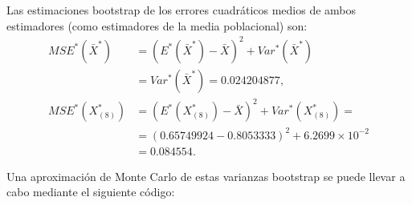 \documentclass[
]{book}
\theoremstyle{break}
\theoremstyle{definition}
\theoremstyle{definition}
\theoremstyle{definition}
\theoremstyle{definition}
\theoremstyle{remark}
\begin{document}
Las estimaciones bootstrap de los errores cuadráticos medios de ambos
estimadores (como estimadores de la media poblacional) son:
\[\begin{aligned}
MSE^{\ast}\left( \bar{X}^{\ast} \right) &= \left( E^{\ast}\left( 
\bar{X}^{\ast} \right) -\bar{X} \right)^2+Var^{\ast}\left( 
\bar{X}^{\ast} \right) \\
&= Var^{\ast}\left( \bar{X}^{\ast} \right) =0.024204877, \\
MSE^{\ast}\left( X_{\left( 8 \right)}^{\ast} \right) &= \left( E^{\ast
}\left( X_{\left( 8 \right)}^{\ast} \right) -\bar{X} \right)
^2+Var^{\ast}\left( X_{\left( 8 \right)}^{\ast} \right) = \\
&= \left( 0.65749924-0.8053333 \right)^2+6.2699 \times 10^{-2}\\
&=  0.084554.
\end{aligned}\]

Una aproximación de Monte Carlo de estas varianzas bootstrap se puede
llevar a cabo mediante el siguiente código:
\end{document}
